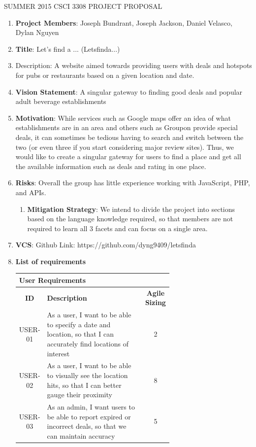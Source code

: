 \documentclass[11pt,letter]{article}
\begin{document}
\begin{center}
SUMMER 2015 CSCI 3308 PROJECT PROPOSAL
\end{center}
\begin{enumerate}
\item \textbf{Project Members}: Joseph Bundrant, Joseph Jackson, Daniel Velasco, Dylan Nguyen
\item \textbf{Title}: Let's find a ... (Letsfinda...)
\item Description: A website aimed towards providing users with deals and hotspots for pubs or restaurants based on a given location and date.
\item \textbf{Vision Statement}: A singular gateway to finding good deals and popular adult beverage establishments
\item \textbf{Motivation}: While services such as Google maps offer an idea of what establishments are in an area and others such as Groupon provide special deals, it can sometimes be tedious having to search and switch between the two (or even three if you start considering major review sites). Thus, we would like to create a singular gateway for users to find a place and get all the available information such as deals and rating in one place.
\item \textbf{Risks}: Overall the group has little experience working with JavaScript, PHP, and APIs.
\begin{enumerate}
\item \textbf{Mitigation Strategy}: We intend to divide the project into sections based on the language knowledge required, so that members are not required to learn all 3 facets and can focus on a single area.
\end{enumerate}
\item \textbf{VCS}: Github Link: https://github.com/dyng9409/letsfinda
\item \textbf{List of requirements}

\begin{center}
\begin{tabular}{|c|p{0.65\linewidth}|c|}
\hline
\multicolumn{3}{|l|}{\textbf{User Requirements}} \\
\hline
\textbf{ID} & \textbf{Description} & \textbf{Agile Sizing} \\
\hline
USER-01 & As a user, I want to be able to specify a date and location, so that I can accurately find locations of interest& 2 \\
\hline
USER-02 & As a user, I want to be able to visually see the location hits, so that I can better gauge their proximity & 8 \\
\hline
USER-03 & As an admin, I want users to be able to report expired or incorrect deals, so that we can maintain accuracy & 5 \\
\hline
\end{tabular}
\end{center}


\end{enumerate}
\end{document}
